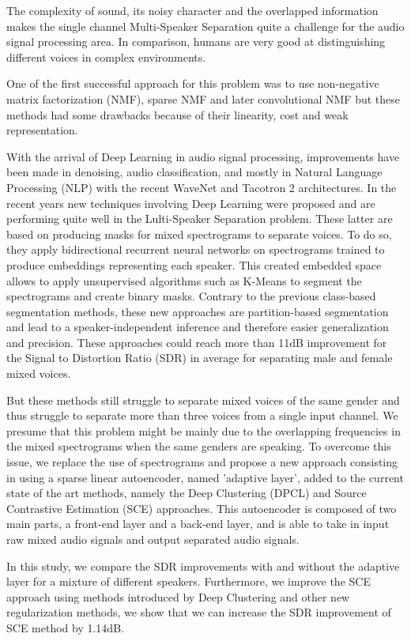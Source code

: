 \documentclass[master,final,11pt]{iscs-thesis}
\date{January 29, 2018}
\begin{document}
\begin{eabstract}

The complexity of sound, its noisy character and the overlapped information makes the single channel Multi-Speaker Separation quite a challenge for the audio signal processing area. In comparison, humans are very good at distinguishing different voices in complex environments.

One of the first successful approach for this problem was to use non-negative matrix factorization (NMF), sparse NMF and later convolutional NMF but these methods had some drawbacks because of their linearity, cost and weak representation.

With the arrival of Deep Learning in audio signal processing, improvements have been made in denoising, audio classification, and mostly in Natural Language Processing  (NLP) with the recent WaveNet and Tacotron 2 architectures. In the recent years new techniques involving Deep Learning were proposed and are performing quite well in the Lulti-Speaker Separation problem. These latter are based on producing masks for mixed spectrograms to separate voices. To do so, they apply bidirectional recurrent neural networks on spectrograms trained to produce embeddings representing each speaker. This created embedded space allows to apply unsupervised algorithms such as K-Means to segment the spectrograms and create binary masks. Contrary to the previous class-based segmentation methods, these new approaches are partition-based segmentation and lead to a speaker-independent inference and therefore easier generalization and precision. These approaches could reach more than 11dB improvement for the Signal to Distortion Ratio (SDR) in average for separating male and female mixed voices.

But these methods still struggle to separate mixed voices of the same gender and thus struggle to separate more than three voices from a single input channel. We presume that this problem might be mainly due to the overlapping frequencies in the mixed spectrograms when the same genders are speaking. To overcome this issue, we replace the use of spectrograms and propose a new approach consisting in using a sparse linear autoencoder, named 'adaptive layer', added to the current state of the art methods, namely the Deep Clustering (DPCL) and Source Contrastive Estimation (SCE) approaches. This autoencoder is composed of two main parts, a front-end layer and a back-end layer, and is able to take in input raw mixed audio signals and output separated audio signals. 

In this study, we compare the SDR improvements with and without the adaptive layer for a mixture of different speakers. Furthermore, we improve the SCE approach using methods introduced by Deep Clustering and other new regularization methods, we show that we can increase the SDR improvement of SCE method by 1.14dB.

\end{eabstract}
\end{document}
